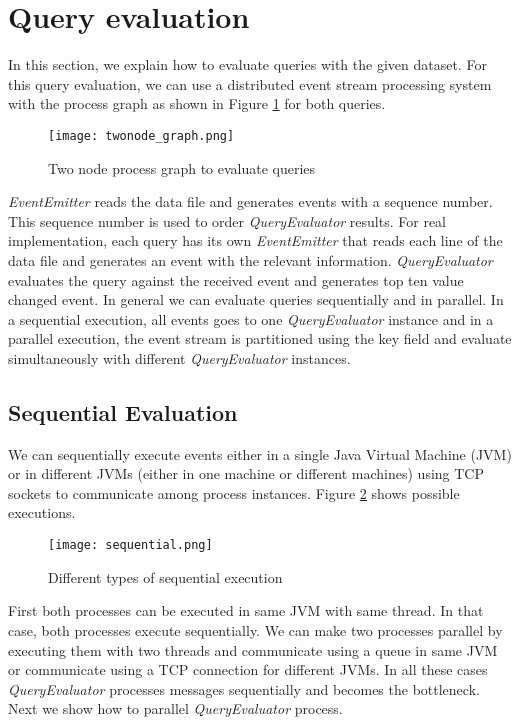 \section{Query evaluation}

In this section, we explain how to evaluate queries with the given dataset. For this query evaluation, we can use a distributed event stream processing system with the process graph as shown in Figure \ref{twonode_graph} for both queries.

\begin{figure}[!t]
        \centering
        \texttt{[image: twonode\_graph.png]}
        \caption{Two node process graph to evaluate queries}
        \label{twonode_graph}
\end{figure}

\textit{EventEmitter} reads the data file and generates events with a sequence number. This sequence number is used to order \textit{QueryEvaluator} results. For real implementation, each query has its own \textit{EventEmitter} that reads each line of the data file and generates an event with the relevant information. \textit{QueryEvaluator} evaluates the query against the received event and generates top ten value changed event.  In general we can evaluate queries sequentially and in parallel. In a sequential execution, all events goes to one \textit{QueryEvaluator} instance and in a parallel execution, the event stream is partitioned using the key field and evaluate simultaneously with different \textit{QueryEvaluator} instances.

\subsection{Sequential Evaluation}

We can sequentially execute events either in a single Java Virtual Machine (JVM) or in different JVMs (either in one machine or different machines) using TCP sockets to communicate among process instances. Figure \ref{sequential} shows possible executions. 

\begin{figure}[!t]
        \centering
        \texttt{[image: sequential.png]}
        \caption{Different types of sequential execution}
        \label{sequential}
\end{figure}

First both processes can be executed in same JVM with same thread. In that case, both processes execute sequentially. We can make two processes parallel by executing them with two threads and communicate using a queue in same JVM or communicate using a TCP connection for different JVMs. In all these cases \textit{QueryEvaluator} processes messages sequentially and becomes the bottleneck. Next we show how to parallel \textit{QueryEvaluator} process. 

